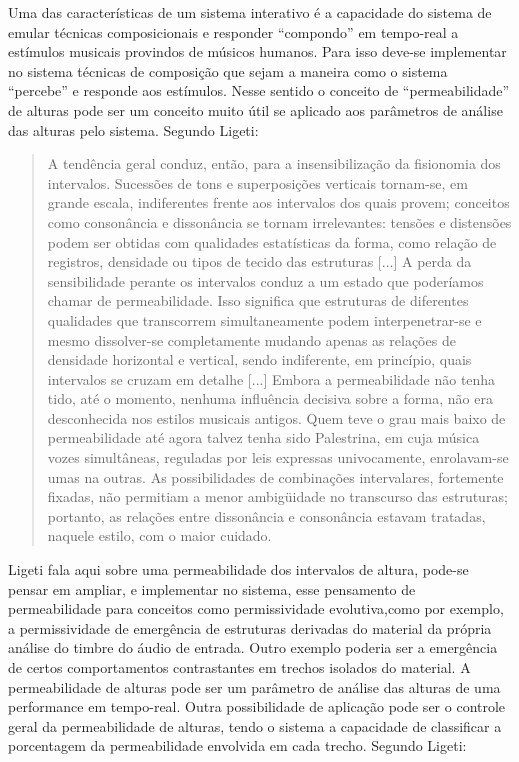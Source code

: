 \documentclass{ppgmus}
\begin{document}
Uma das características de um sistema interativo é a capacidade do sistema
de emular técnicas composicionais e responder ``compondo'' em tempo-real a
estímulos musicais provindos de músicos humanos. Para isso deve-se implementar
no sistema técnicas de composição que sejam a maneira como o sistema ``percebe''
e responde aos estímulos. Nesse sentido o conceito de “permeabilidade” de 
alturas \cite{ligeti58:transformacoes} pode ser um conceito muito útil se aplicado aos parâmetros
de análise das alturas pelo sistema. Segundo Ligeti:

\begin{quote}
  A tendência geral conduz, então, para a insensibilização da
  fisionomia dos intervalos. Sucessões de tons e superposições
  verticais tornam-se, em grande escala, indiferentes frente aos
  intervalos dos quais provem; conceitos como consonância e
  dissonância se tornam irrelevantes: tensões e distensões podem ser
  obtidas com qualidades estatísticas da forma, como relação de
  registros, densidade ou tipos de tecido das estruturas [...] A perda
  da sensibilidade perante os intervalos conduz a um estado que
  poderíamos chamar de permeabilidade. Isso significa que estruturas
  de diferentes qualidades que transcorrem simultaneamente podem
  interpenetrar-se e mesmo dissolver-se completamente mudando apenas
  as relações de densidade horizontal e vertical, sendo indiferente,
  em princípio, quais intervalos se cruzam em detalhe [...] Embora a
  permeabilidade não tenha tido, até o momento, nenhuma influência
  decisiva sobre a forma, não era desconhecida nos estilos musicais
  antigos. Quem teve o grau mais baixo de permeabilidade até agora
  talvez tenha sido Palestrina, em cuja música vozes simultâneas,
  reguladas por leis expressas univocamente, enrolavam-se umas na
  outras. As possibilidades de combinações intervalares, fortemente
  fixadas, não permitiam a menor ambigüidade no transcurso das
  estruturas; portanto, as relações entre dissonância e consonância
  estavam tratadas, naquele estilo, com o maior cuidado.
\end{quote}
 
Ligeti fala aqui sobre uma permeabilidade dos intervalos de altura,
pode-se pensar em ampliar, e implementar no sistema, esse pensamento
de permeabilidade para conceitos como permissividade evolutiva,como por
exemplo, a permissividade de emergência de estruturas derivadas do material 
da própria análise do timbre do áudio de entrada. Outro exemplo poderia ser a 
emergência de certos comportamentos contrastantes em trechos isolados do material.
A permeabilidade de alturas pode ser um parâmetro de análise das alturas 
de uma performance em tempo-real. Outra possibilidade de aplicação pode ser o
controle geral da permeabilidade de alturas, tendo o sistema a capacidade de
classificar a porcentagem da permeabilidade envolvida em cada trecho. Segundo
Ligeti: 
\end{document}
